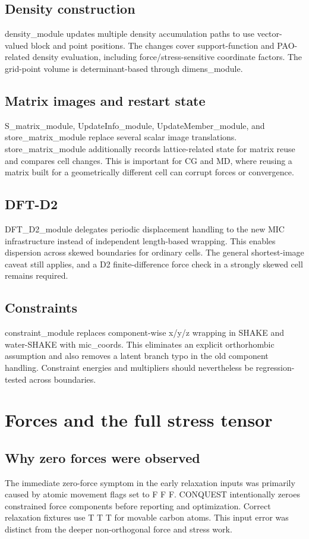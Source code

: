 \documentclass[10pt,a4paper]{report}
\begin{document}
\section{Density construction}
density\_module updates multiple density accumulation paths to use vector-valued block and point positions. The changes cover support-function and PAO-related density evaluation, including force/stress-sensitive coordinate factors. The grid-point volume is determinant-based through dimens\_module.

\section{Matrix images and restart state}
S\_matrix\_module, UpdateInfo\_module, UpdateMember\_module, and store\_matrix\_module replace several scalar image translations. store\_matrix\_module additionally records lattice-related state for matrix reuse and compares cell changes. This is important for CG and MD, where reusing a matrix built for a geometrically different cell can corrupt forces or convergence.

\section{DFT-D2}
DFT\_D2\_module delegates periodic displacement handling to the new MIC infrastructure instead of independent length-based wrapping. This enables dispersion across skewed boundaries for ordinary cells. The general shortest-image caveat still applies, and a D2 finite-difference force check in a strongly skewed cell remains required.

\section{Constraints}
constraint\_module replaces component-wise x/y/z wrapping in SHAKE and water-SHAKE with mic\_coords. This eliminates an explicit orthorhombic assumption and also removes a latent branch typo in the old component handling. Constraint energies and multipliers should nevertheless be regression-tested across boundaries.

\chapter{Forces and the full stress tensor}
\section{Why zero forces were observed}
The immediate zero-force symptom in the early relaxation inputs was primarily caused by atomic movement flags set to F F F. CONQUEST intentionally zeroes constrained force components before reporting and optimization. Correct relaxation fixtures use T T T for movable carbon atoms. This input error was distinct from the deeper non-orthogonal force and stress work.
\end{document}
